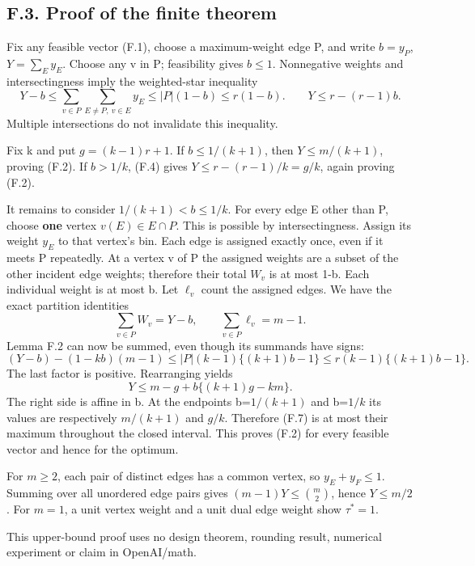 \documentclass[
  11pt,
]{article}
\begin{document}
\subsection{F.3. Proof of the finite
theorem}\label{f.3.-proof-of-the-finite-theorem}

Fix any feasible vector (F.1), choose a maximum-weight edge P, and write
\(b=y_P\), \(Y=\sum_Ey_E\). Choose any v in P; feasibility gives
\(b\le1\). Nonnegative weights and intersectingness imply the
weighted-star inequality \[
 Y-b\le\sum_{v\in P}\sum_{E\ne P,\ v\in E}y_E
                         \le|P|(1-b)\le r(1-b).
 \qquad Y\le r-(r-1)b.                                     \tag{F.4}
\] Multiple intersections do not invalidate this inequality.

Fix k and put \(g=(k-1)r+1\). If \(b\le1/(k+1)\), then \(Y\le m/(k+1)\),
proving (F.2). If \(b>1/k\), (F.4) gives \(Y\le r-(r-1)/k=g/k\), again
proving (F.2).

It remains to consider \(1/(k+1)<b\le1/k\). For every edge E other than
P, choose \textbf{one} vertex \(v(E)\in E\cap P\). This is possible by
intersectingness. Assign its weight \(y_E\) to that vertex's bin. Each
edge is assigned exactly once, even if it meets P repeatedly. At a
vertex v of P the assigned weights are a subset of the other incident
edge weights; therefore their total \(W_v\) is at most 1-b. Each
individual weight is at most b. Let \(\ell_v\) count the assigned edges.
We have the exact partition identities \[
                \sum_{v\in P}W_v=Y-b,\qquad
                \sum_{v\in P}\ell_v=m-1.                    \tag{F.5}
\] Lemma F.2 can now be summed, even though its summands have signs: \[
       (Y-b)-(1-kb)(m-1)
          \le |P|(k-1)\{(k+1)b-1\}
          \le r(k-1)\{(k+1)b-1\}.                          \tag{F.6}
\] The last factor is positive. Rearranging yields \[
          Y\le m-g+b\{(k+1)g-km\}.                        \tag{F.7}
\] The right side is affine in b. At the endpoints b=\(1/(k+1)\) and
b=\(1/k\) its values are respectively \(m/(k+1)\) and \(g/k\). Therefore
(F.7) is at most their maximum throughout the closed interval. This
proves (F.2) for every feasible vector and hence for the optimum.

For \(m\ge2\), each pair of distinct edges has a common vertex, so
\(y_E+y_F\le1\). Summing over all unordered edge pairs gives
\((m-1)Y\le\binom m2\), hence \(Y\le m/2\). For \(m=1\), a unit vertex
weight and a unit dual edge weight show \(\tau^*=1\).

This upper-bound proof uses no design theorem, rounding result,
numerical experiment or claim in OpenAI/math.
\end{document}
